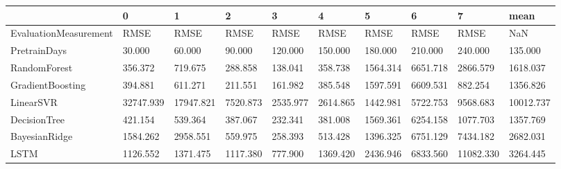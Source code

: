 \begin{tabular}{llllllllll}
\toprule
{} &         0 &         1 &        2 &        3 &        4 &        5 &        6 &         7 &      mean \\
\midrule
EvaluationMeasurement &      RMSE &      RMSE &     RMSE &     RMSE &     RMSE &     RMSE &     RMSE &      RMSE &       NaN \\
PretrainDays          &    30.000 &    60.000 &   90.000 &  120.000 &  150.000 &  180.000 &  210.000 &   240.000 &   135.000 \\
RandomForest          &   356.372 &   719.675 &  288.858 &  138.041 &  358.738 & 1564.314 & 6651.718 &  2866.579 &  1618.037 \\
GradientBoosting      &   394.881 &   611.271 &  211.551 &  161.982 &  385.548 & 1597.591 & 6609.531 &   882.254 &  1356.826 \\
LinearSVR             & 32747.939 & 17947.821 & 7520.873 & 2535.977 & 2614.865 & 1442.981 & 5722.753 &  9568.683 & 10012.737 \\
DecisionTree          &   421.154 &   539.364 &  387.067 &  232.341 &  381.008 & 1569.361 & 6254.158 &  1077.703 &  1357.769 \\
BayesianRidge         &  1584.262 &  2958.551 &  559.975 &  258.393 &  513.428 & 1396.325 & 6751.129 &  7434.182 &  2682.031 \\
LSTM                  &  1126.552 &  1371.475 & 1117.380 &  777.900 & 1369.420 & 2436.946 & 6833.560 & 11082.330 &  3264.445 \\
\bottomrule
\end{tabular}
